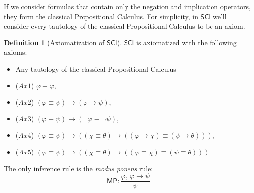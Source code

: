 \documentclass{article}
\theoremstyle{definition}
\newtheorem{definition}{Definition}[section]
\theoremstyle{definition}
\theoremstyle{definition}
\newcommand*{\id}{\equiv}
\newcommand*{\ra}{\rightarrow}
\newcommand{\SCI}{$\mathsf{SCI}$\xspace}
\begin{document}
If we consider formulas that contain only the negation and implication
operators, they form the classical Propositional Calculus. For simplicity, in
\SCI we'll consider every tautology of the classical Propositional Calculus to
be an axiom.

\begin{definition}[Axiomatization of \SCI]
    \label{axiomatization}
    \SCI is axiomatized with the following axioms:
    \begin{itemize}
        \item Any tautology of the classical Propositional Calculus
        \item ($Ax1$) $\varphi \id \varphi$,
        \item ($Ax2$) $(\varphi \id \psi) \ra (\varphi \ra \psi)$,
        \item ($Ax3$) $(\varphi \id \psi) \ra (\lnot \varphi \id \lnot \psi)$,
        \item ($Ax4$) $(\varphi \id \psi) \ra ((\chi \id \theta) \ra ((\varphi \ra \chi) \id (\psi \ra \theta)))$,
        \item ($Ax5$) $(\varphi \id \psi) \ra ((\chi \id \theta) \ra ((\varphi \id \chi) \id (\psi \id \theta)))$.
    \end{itemize}
    The only inference rule is the \emph{modus ponens} rule:
    $$
        \mathsf{MP}: \frac{
            \varphi, \ \varphi \ra \psi}%
        { \psi }
    $$
\end{definition}
\end{document}
